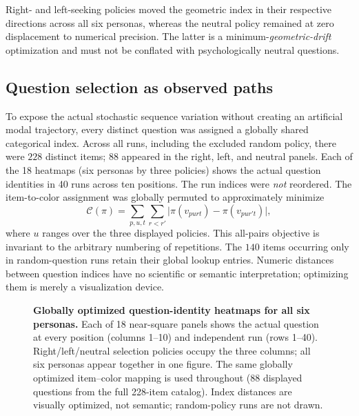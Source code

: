 Right- and left-seeking policies moved the geometric index in their
respective directions across all six personas, whereas the neutral policy
remained at zero displacement to numerical precision. The latter is a
minimum-\emph{geometric-drift} optimization and must not be conflated with
psychologically neutral questions.

\subsection{Question selection as observed paths}
To expose the actual stochastic sequence variation without creating an
artificial modal trajectory, every distinct question was assigned a globally
shared categorical index. Across all runs, including the excluded random
policy, there were $228$ distinct items; $88$ appeared in the right, left,
and neutral panels. Each of the 18 heatmaps (six personas by three policies)
shows the actual question identities in 40 runs across ten positions.
The run indices were \emph{not} reordered.
The item-to-color assignment was globally permuted to approximately minimize
\begin{equation}
\mathcal C(\pi)=\sum_{p,u,t}\sum_{r<r'}
\big|\pi(v_{purt})-\pi(v_{pur't})\big|,
\label{eq:question-seriation}
\end{equation}
where $u$ ranges over the three displayed policies. This all-pairs
objective is invariant to the arbitrary numbering of repetitions. The
$140$ items occurring only in random-question runs retain their global
lookup entries. Numeric distances between question indices have no
scientific or semantic interpretation; optimizing them is merely a
visualization device.

\begin{figure}[!p]
\centering

\caption{\textbf{Globally optimized question-identity heatmaps for all six personas.}
Each of 18 near-square panels shows the actual question at every
position (columns 1--10) and independent run (rows 1--40).
Right/left/neutral selection policies occupy the three columns;
all six personas appear together in one figure. The same globally
optimized item--color mapping is used throughout (88 displayed
questions from the full 228-item catalog). Index distances are
visually optimized, not semantic; random-policy runs are not drawn.}
\label{fig:question-map}
\end{figure}

